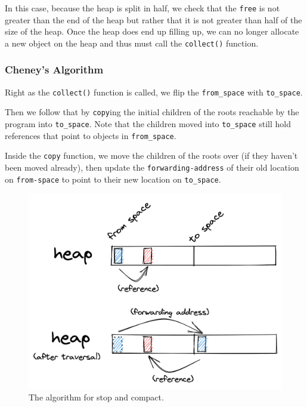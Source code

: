 \documentclass[index]{subfiles}
\begin{document}
In this case, because the heap is split in half, we check that the \verb+free+ is not greater than the end of the heap but rather that it is not greater than half of the size of the heap. Once the heap does end up filling up, we can no longer allocate a new object on the heap and thus must call the \verb+collect()+ function.

\subsubsection{Cheney's Algorithm}

Right as the \verb+collect()+ function is called, we flip the \verb+from_space+ with \verb+to_space+.


Then we follow that by \verb+copy+ing the initial children of the roots reachable by the program into \verb+to_space+. Note that the children moved into \verb+to_space+ still hold references that point to objects in \verb+from_space+.

Inside the \verb+copy+ function, we move the children of the roots over (if they haven't been moved already), then update the \verb+forwarding-address+ of their old location on \verb+from-space+ to point to their new location on \verb+to_space+.

\begin{figure}[H]
    \centering
    \includegraphics[scale=0.14]{pics/visualization-of-worklist.png}
    \caption{The algorithm for stop and compact. }
\end{figure}
\end{document}
